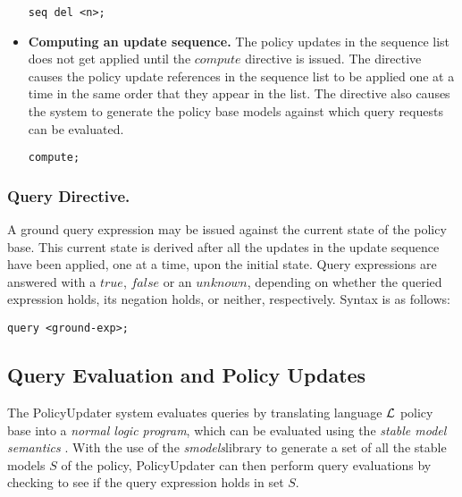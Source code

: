 \documentclass[11pt]{llncs}
\begin{document}
\begin{itemize}
            \begin{verbatim}seq del <n>;\end{verbatim}

          \vspace{1mm}
          \item
            {\bf Computing an update sequence.} The policy updates in the
            sequence list does not get applied until the $compute$ directive
            is issued. The directive causes the policy update references in
            the sequence list to be applied one at a time in the same order
            that they appear in the list. The directive also causes the
            system to generate the policy base models against which query
            requests can be evaluated.

           \begin{verbatim}compute;\end{verbatim}
        \end{itemize}

      \subsubsection{Query Directive.}

        A ground query expression may be issued against the current state of
        the policy base. This current state is derived after all the updates
        in the update sequence have been applied, one at a time, upon the
        initial state. Query expressions are answered with a $true$, $false$
        or an $unknown$, depending on whether the queried expression holds,
        its negation holds, or neither, respectively. Syntax is as follows:

        \begin{verbatim}query <ground-exp>;\end{verbatim}

    \subsection{Query Evaluation and Policy Updates}

      The PolicyUpdater system evaluates queries by translating language
      ${\cal L}$ policy base into a {\em normal logic program}, which can be
      evaluated using the {\em stable model semantics} \cite{SIM}. With the use
      of the {\em smodels}\footnotemark library to generate a set of all the
      stable models $S$ of the policy, PolicyUpdater can then perform query
      evaluations by checking to see if the query expression holds in set $S$.
\end{document}
